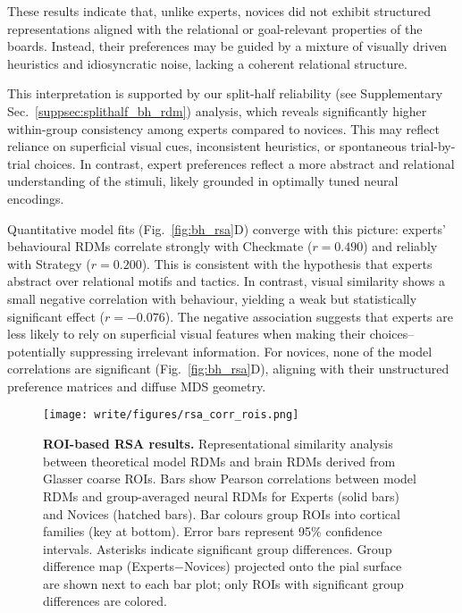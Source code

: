 \documentclass[preprint,12pt]{elsarticle}
\begin{document}
These results indicate that, unlike experts, novices did not exhibit structured representations aligned with the relational or goal-relevant properties of the boards. Instead, their preferences may be guided by a mixture of visually driven heuristics and idiosyncratic noise, lacking a coherent relational structure. 

This interpretation is supported by our split-half reliability (see Supplementary Sec.~\ref{suppsec:splithalf_bh_rdm}) analysis, which reveals significantly higher within-group consistency among experts compared to novices. This may reflect reliance on superficial visual cues, inconsistent heuristics, or spontaneous trial-by-trial choices. In contrast, expert preferences reflect a more abstract and relational understanding of the stimuli, likely grounded in optimally tuned neural encodings.

Quantitative model fits (Fig.~\ref{fig:bh_rsa}D) converge with this picture: experts’ behavioural RDMs correlate strongly with Checkmate ($r = 0.490$) and reliably with Strategy ($r = 0.200$). This is consistent with the hypothesis that experts abstract over relational motifs and tactics. In contrast, visual similarity shows a small negative correlation with behaviour, yielding a weak but statistically significant effect ($r = -0.076$). The negative association suggests that experts are less likely to rely on superficial visual features when making their choices--potentially suppressing irrelevant information. For novices, none of the model correlations are significant (Fig.~\ref{fig:bh_rsa}D), aligning with their unstructured preference matrices and diffuse MDS geometry.

\begin{figure}[!htp]
  \centering
  \texttt{[image: write/figures/rsa\_corr\_rois.png]}
  \caption{ 
  \textbf{ROI-based RSA results.} 
  Representational similarity analysis between theoretical model RDMs and brain RDMs derived from Glasser coarse ROIs. Bars show Pearson correlations between model RDMs and group-averaged neural RDMs for Experts (solid bars) and Novices (hatched bars). Bar colours group ROIs into cortical families (key at bottom). Error bars represent 95\% confidence intervals. Asterisks indicate significant group differences. Group difference map (Experts$-$Novices) projected onto the pial surface are shown next to each bar plot; only ROIs with significant group differences are colored.
  }
  \label{fig:rsa_rois}
\end{figure}
\end{document}
